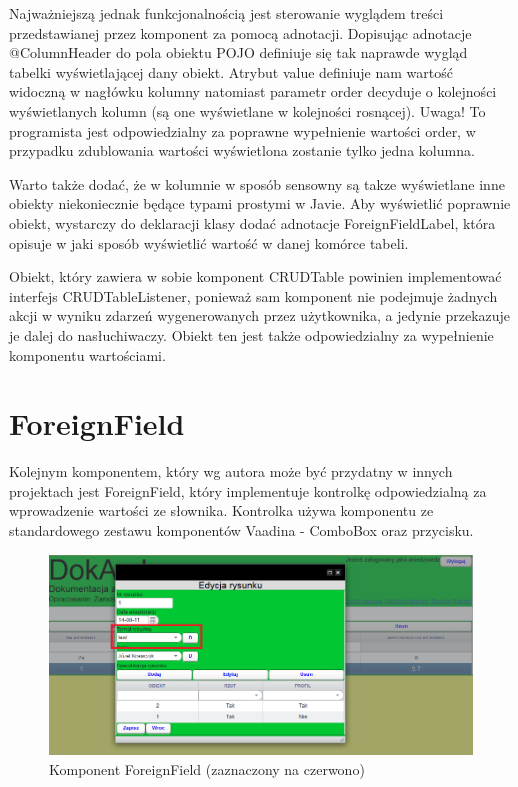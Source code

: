 Najważniejszą jednak funkcjonalnością jest sterowanie wyglądem treści przedstawianej przez komponent za pomocą adnotacji. Dopisując adnotacje @ColumnHeader do pola obiektu POJO definiuje się tak naprawde wygląd tabelki wyświetlającej dany obiekt. Atrybut value definiuje nam wartość widoczną w nagłówku kolumny natomiast parametr order decyduje o kolejności wyświetlanych kolumn (są one wyświetlane w kolejności rosnącej). Uwaga! To programista jest odpowiedzialny za poprawne wypełnienie wartości order, w przypadku zdublowania wartości wyświetlona zostanie tylko jedna kolumna.

Warto także dodać, że w kolumnie w sposób sensowny są takze wyświetlane inne obiekty niekoniecznie będące typami prostymi w Javie. Aby wyświetlić poprawnie obiekt, wystarczy do deklaracji klasy dodać adnotacje ForeignFieldLabel, która opisuje w jaki sposób wyświetlić wartość w danej komórce tabeli.

Obiekt, który zawiera w sobie komponent CRUDTable powinien implementować interfejs CRUDTableListener, ponieważ sam komponent nie podejmuje żadnych akcji w wyniku zdarzeń wygenerowanych przez użytkownika, a jedynie przekazuje je dalej do nasłuchiwaczy. Obiekt ten jest także odpowiedzialny za wypełnienie komponentu wartościami.
\newpage
\section{ForeignField}
Kolejnym komponentem, który wg autora może być przydatny w innych projektach jest ForeignField, który implementuje kontrolkę odpowiedzialną za wprowadzenie wartości ze słownika. Kontrolka używa komponentu ze standardowego zestawu komponentów Vaadina - ComboBox oraz przycisku.

\begin{figure} [H]
    \begin{center}
	\includegraphics[scale=.6]{img/foreignField.png}
	\caption{Komponent ForeignField (zaznaczony na czerwono)}
	\label{formField}
    \end{center}
\end{figure}

